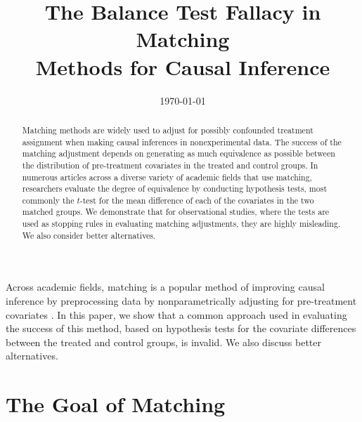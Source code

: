 \documentclass[11pt,titlepage]{article}
\title{The Balance Test Fallacy in Matching\\ Methods for Causal
  Inference}
\author{}
\date{\today}
\begin{document}
\maketitle
{}\baselineskip

\begin{abstract}
  Matching methods are widely used to adjust for possibly confounded
  treatment assignment when making causal inferences in
  nonexperimental data.  The success of the matching adjustment
  depends on generating as much equivalence as possible between the
  distribution of pre-treatment covariates in the treated and control
  groups.  In numerous articles across a diverse variety of academic
  fields that use matching, researchers evaluate the degree of
  equivalence by conducting hypothesis tests, most commonly the
  $t$-test for the mean difference of each of the covariates in the
  two matched groups.  We demonstrate that for observational studies,
  where the tests are used as stopping rules in evaluating matching
  adjustments, they are highly misleading.  We also consider better
  alternatives.
\end{abstract}

Across academic fields, matching is a popular method of improving
causal inference by preprocessing data by nonparametrically adjusting
for pre-treatment covariates \citep{Imbens04,Rosenbaum02,Rubin06}.  In
this paper, we show that a common approach used in evaluating the
success of this method, based on hypothesis tests for the covariate
differences between the treated and control groups, is invalid.  We
also discuss better alternatives.

\section{The Goal of Matching}
\end{document}
